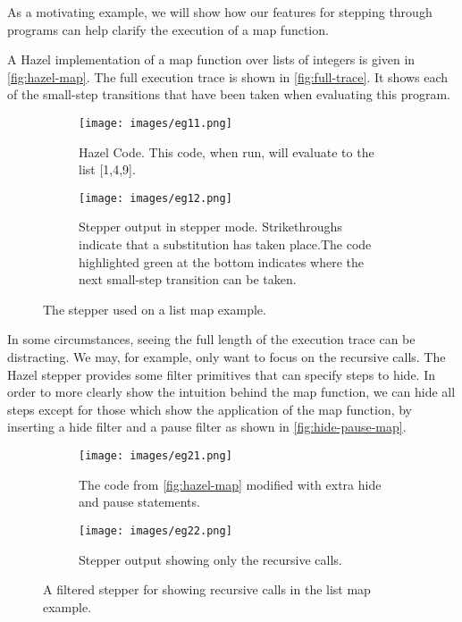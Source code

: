 As a motivating example, we will show how our features for stepping through programs can help clarify the execution of a map function.

A Hazel implementation of a map function over lists of integers is given in \autoref{fig:hazel-map}. The full execution trace is shown in \autoref{fig:full-trace}. It shows each of the small-step transitions that have been taken when evaluating this program. 

\begin{figure}
    \centering
    \begin{minipage}{.40\linewidth}
    \begin{subfigure}{\linewidth}
        \texttt{[image: images/eg11.png]}
        \caption{Hazel Code. This code, when run, will evaluate to the list [1,4,9].}
        \label{fig:hazel-map}
    \end{subfigure}
    \end{minipage}
    \hfill
    \begin{minipage}{.57\linewidth}
    \begin{subfigure}{\linewidth}
        \texttt{[image: images/eg12.png]}
        \caption{Stepper output in stepper mode. Strikethroughs indicate that a substitution has taken place.The code highlighted green at the bottom indicates where the next small-step transition can be taken.}
        \label{fig:full-trace}
    \end{subfigure}
    \end{minipage}
    \caption{The stepper used on a list map example.}
\end{figure}

In some circumstances, seeing the full length of the execution trace can be distracting. We may, for example, only want to focus on the recursive calls. The Hazel stepper provides some filter primitives that can specify steps to hide. In order to more clearly show the intuition behind the map function, we can hide all steps except for those which show the application of the map function, by inserting a hide filter and a pause filter as shown in \autoref{fig:hide-pause-map}.

\begin{figure}
    \centering
    \begin{minipage}{.40\linewidth}
    \begin{subfigure}{\linewidth}
        \texttt{[image: images/eg21.png]}
        \caption{The code from \autoref{fig:hazel-map} modified with extra hide and pause statements.}
        \label{fig:hide-pause-map}
    \end{subfigure}
    \end{minipage}
    \hfill
    \begin{minipage}{.57\linewidth}
    \begin{subfigure}{\linewidth}
        \texttt{[image: images/eg22.png]}
        \caption{Stepper output showing only the recursive calls.}
        \label{fig:full-trace}
    \end{subfigure}
    \end{minipage}
    \caption{A filtered stepper for showing recursive calls in the list map example.}
\end{figure}

